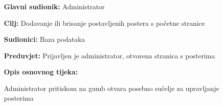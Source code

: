					\noindent {}
					\begin{packed_item}
						
						\item \textbf{Glavni sudionik: } Administrator
						\item  \textbf{Cilj:} Dodavanje ili brisanje postavljenih postera s početne stranice
						\item  \textbf{Sudionici:} Baza podataka
						\item  \textbf{Preduvjet:} Prijavljen je administrator, otvorena stranica s posterima
						\item  \textbf{Opis osnovnog tijeka:}
						
						\item[] \begin{packed_enum}
							
							\item Administrator pritiskom na gumb otvara posebno sučelje za upravljanje posterima
						\end{packed_enum}
						
						
					\end{packed_item}
					
